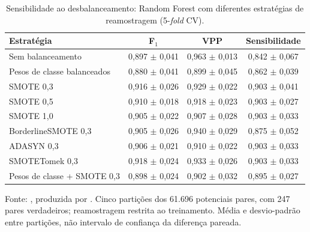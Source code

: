 \begin{table}[htbp]
\centering
\caption{Sensibilidade ao desbalanceamento: Random Forest com diferentes estrat\'egias de reamostragem (5-\textit{fold} CV).}
\label{tab:imbalance-sensitivity}
\begin{tabular}{lccc}
\toprule
Estrat\'egia & F$_1$ & VPP & Sensibilidade \\
\midrule
Sem balanceamento & 0,897 $\pm$ 0,041 & 0,963 $\pm$ 0,013 & 0,842 $\pm$ 0,067 \\
Pesos de classe balanceados & 0,880 $\pm$ 0,041 & 0,899 $\pm$ 0,045 & 0,862 $\pm$ 0,039 \\
SMOTE 0,3 & 0,916 $\pm$ 0,026 & 0,929 $\pm$ 0,022 & 0,903 $\pm$ 0,041 \\
SMOTE 0,5 & 0,910 $\pm$ 0,018 & 0,918 $\pm$ 0,023 & 0,903 $\pm$ 0,027 \\
SMOTE 1,0 & 0,905 $\pm$ 0,022 & 0,907 $\pm$ 0,028 & 0,903 $\pm$ 0,033 \\
BorderlineSMOTE 0,3 & 0,905 $\pm$ 0,026 & 0,940 $\pm$ 0,029 & 0,875 $\pm$ 0,052 \\
ADASYN 0,3 & 0,906 $\pm$ 0,021 & 0,910 $\pm$ 0,022 & 0,903 $\pm$ 0,033 \\
SMOTETomek 0,3 & 0,918 $\pm$ 0,024 & 0,933 $\pm$ 0,026 & 0,903 $\pm$ 0,033 \\
Pesos de classe + SMOTE 0,3 & 0,898 $\pm$ 0,024 & 0,902 $\pm$ 0,032 & 0,895 $\pm$ 0,027 \\
\bottomrule
\end{tabular}
\par\footnotesize Fonte: , produzida por . Cinco partições dos 61.696 potenciais pares, com 247 pares verdadeiros; reamostragem restrita ao treinamento. Média e desvio-padrão entre partições, não intervalo de confiança da diferença pareada.
\end{table}